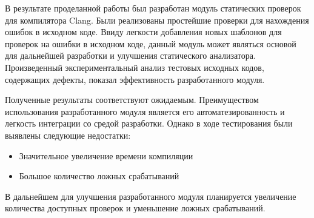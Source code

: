 \conclusion
В результате проделанной работы был разработан модуль статических проверок для компилятора Clang.
Были реализованы простейшие проверки для нахождения ошибок в исходном коде. Ввиду легкости добавления новых 
шаблонов для проверок на ошибки в исходном коде, данный модуль может являться основой для дальнейшей 
разработки и улучшения статического анализатора. 
Произведенный экспериментальный анализ тестовых исходных кодов, содержащих дефекты, показал
эффективность разработанного модуля. 

Полученные результаты соответствуют ожидаемым. Преимуществом использования разработанного модуля
является его автоматезированность и легкость интеграции со средой разработки. Однако в ходе тестирования были
выявлены следующие недостатки:
\begin{itemize}
	\item Значительное увеличение времени компиляции
	\item Большое количество ложных срабатываний 
\end{itemize}

В дальнейшем для улучшения разработанного модуля планируется увеличение количества доступных проверок и 
уменьшение ложных срабатываний.
